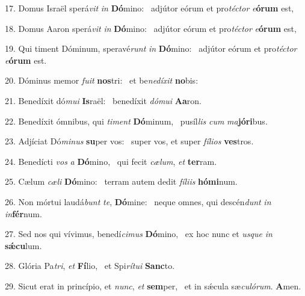 17. Domus Israël sperá\textit{vit} \textit{in} \textbf{Dó}mino: \ast\  adjútor eórum et pro\textit{téc}\textit{tor} \textit{e}\textbf{ó}\textbf{rum} est,\

18. Domus Aaron sperá\textit{vit} \textit{in} \textbf{Dó}mino: \ast\  adjútor eórum et pro\textit{téc}\textit{tor} \textit{e}\textbf{ó}\textbf{rum} est,\

19. Qui timent Dóminum, speravé\textit{runt} \textit{in} \textbf{Dó}mino: \ast\  adjútor eórum et pro\textit{téc}\textit{tor} \textit{e}\textbf{ó}\textbf{rum} est.\

20. Dóminus memor \textit{fu}\textit{it} \textbf{nos}tri: \ast\  et be\textit{ne}\textit{dí}\textit{xit} \textbf{no}bis:\

21. Benedíxit dó\textit{mu}\textit{i} \textbf{Is}raël: \ast\  benedíxit \textit{dó}\textit{mu}\textit{i} \textbf{A}\textbf{a}ron.\

22. Benedíxit ómnibus, qui \textit{ti}\textit{ment} \textbf{Dó}minum, \ast\  pusíl\textit{lis} \textit{cum} \textit{ma}\textbf{jó}\textbf{ri}bus.\

23. Adjíciat Dó\textit{mi}\textit{nus} \textbf{su}per vos: \ast\  super vos, et super \textit{fí}\textit{li}\textit{os} \textbf{ves}tros.\

24. Benedícti \textit{vos} \textit{a} \textbf{Dó}mino, \ast\  qui fecit \textit{cæ}\textit{lum}, \textit{et} \textbf{ter}ram.\

25. Cælum \textit{cæ}\textit{li} \textbf{Dó}mino: \ast\  terram autem dedit \textit{fí}\textit{li}\textit{is} \textbf{hó}\textbf{mi}num.\

26. Non mórtui laudá\textit{bunt} \textit{te}, \textbf{Dó}mine: \ast\  neque omnes, qui descén\textit{dunt} \textit{in} \textit{in}\textbf{fér}num.\

27. Sed nos qui vívimus, benedí\textit{ci}\textit{mus} \textbf{Dó}mino, \ast\  ex hoc nunc et \textit{us}\textit{que} \textit{in} \textbf{sǽ}\textbf{cu}lum.\

28. Glória Pa\textit{tri}, \textit{et} \textbf{Fí}lio, \ast\  et Spi\textit{rí}\textit{tu}\textit{i} \textbf{Sanc}to.\

29. Sicut erat in princípio, et \textit{nunc}, \textit{et} \textbf{sem}per, \ast\  et in sǽcula sæ\textit{cu}\textit{ló}\textit{rum}. \textbf{A}men.\

